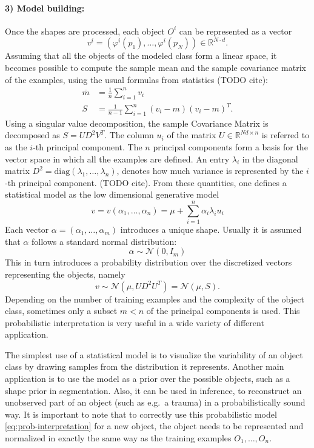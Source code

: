 \documentclass{InsightArticle}
\def\R{\mathds{R}} %
\begin{document}
\paragraph{3) Model building:}
Once the shapes are processed, each object $O^i$ can be
represented as a vector 
\[
v^i = (\varphi^i(p_1), \ldots, \varphi^i(p_N)) \in \R^{N\cdot d}.  
\]
 Assuming that all the
objects of the modeled class form a linear space, it
becomes possible to compute the sample mean and the sample covariance matrix
of the examples, using the usual formulas from statistics (TODO cite):
\begin{equation}
 \begin{split}
   \overline{m} & = \frac{1}{n} \sum_{i=1}^n v_i \\
   S &= \frac{1}{n-1} \sum_{i=1}^n (v_i -m) (v_i - m)^T.
   \end{split}
\end{equation}
Using a singular value decomposition, the sample Covariance Matrix is decomposed
as $S=UD^2V^T$. The column $u_i$ of the 
matrix $U \in \R^{Nd \times n}$ is referred to as the $i$-th principal component.
The $n$ principal components form a basis for the vector space in which all the examples are defined. 
An entry $\lambda_i$ in the diagonal matrix $D^2 = \text{diag}(\lambda_1, \ldots, \lambda_n)$,  denotes how much variance is represented by the $i$-th principal component. (TODO cite).
From these quantities, one defines a statistical model as the low dimensional generative model
\[
v = v(\alpha_1, \ldots, \alpha_n) = \mu  + \sum_{i=1}^n \alpha_i \lambda_i u_i
\]
Each vector $\alpha = (\alpha_1, \ldots, \alpha_m)$ introduces a unique shape. 
Usually it is assumed that $\alpha$ follows a standard normal distribution: 
\begin{equation} \label{eq:coeff-normal-assumption}
\alpha  \sim \mathcal{N}(0, I_m)
\end{equation}
This in turn introduces a probability distribution over the discretized vectors representing the objects, namely 
\begin{equation} \label{eq:prob-interpretation}
v \sim \mathcal{N}(\mu, UD^2U^T) = \mathcal{N}(\mu, S).
\end{equation}
Depending on the number of training examples and the complexity of the object class, sometimes only a subset $m < n$ of the principal components is used. 
This probabilistic interpretation is very useful in a wide variety of different application. 

The simplest use of a statistical model is to visualize the variability
of an object class by drawing samples from the distribution it
represents.  Another main application is to use the model as a prior
over the possible objects, such as a shape prior in segmentation.
Also, it can be used in inference, to reconstruct an unobserved part
of an object (such as e.g.\ a trauma) in a probabilistically sound
way.  It is important to note that to correctly use this probabilistic
model \eqref{eq:prob-interpretation} for a new object, the object
needs to be represented and normalized in exactly the same way as the
training examples $O_1, \ldots, O_n$.
\end{document}
